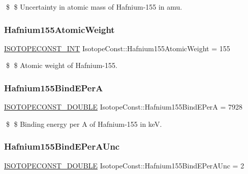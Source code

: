 \$ \$ Uncertainty in atomic mass of Hafnium-\/155 in amu. \mbox{\label{group___isotope_const-_hafnium-_hf155_gaff78a64e7fd09362bcfcf5663ee680e1}} 
\subsubsection{\texorpdfstring{Hafnium155\+Atomic\+Weight}{Hafnium155AtomicWeight}}
{\footnotesize\ttfamily \mbox{\hyperlink{group___isotope_const-_macros_ga5f18360b3e99483a35c32d789e62621c}{I\+S\+O\+T\+O\+P\+E\+C\+O\+N\+S\+T\+\_\+\+I\+NT}} Isotope\+Const\+::\+Hafnium155\+Atomic\+Weight = 155}

\$ \$ Atomic weight of Hafnium-\/155. \mbox{\label{group___isotope_const-_hafnium-_hf155_ga8508aef17065734165a456be416deb38}} 
\subsubsection{\texorpdfstring{Hafnium155\+Bind\+E\+PerA}{Hafnium155BindEPerA}}
{\footnotesize\ttfamily \mbox{\hyperlink{group___isotope_const-_macros_ga8f45a7272ce02c0b4c65c44636ed719a}{I\+S\+O\+T\+O\+P\+E\+C\+O\+N\+S\+T\+\_\+\+D\+O\+U\+B\+LE}} Isotope\+Const\+::\+Hafnium155\+Bind\+E\+PerA = 7928}

\$ \$ Binding energy per A of Hafnium-\/155 in keV. \mbox{\label{group___isotope_const-_hafnium-_hf155_ga404bdb40e313286f6d13f8b77545c903}} 
\subsubsection{\texorpdfstring{Hafnium155\+Bind\+E\+Per\+A\+Unc}{Hafnium155BindEPerAUnc}}
{\footnotesize\ttfamily \mbox{\hyperlink{group___isotope_const-_macros_ga8f45a7272ce02c0b4c65c44636ed719a}{I\+S\+O\+T\+O\+P\+E\+C\+O\+N\+S\+T\+\_\+\+D\+O\+U\+B\+LE}} Isotope\+Const\+::\+Hafnium155\+Bind\+E\+Per\+A\+Unc = 2}

